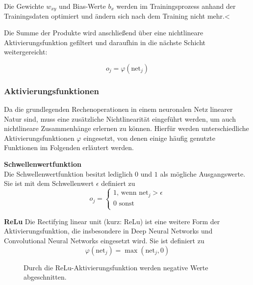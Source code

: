 		Die Gewichte $w_{xy}$ und Bias-Werte $b_x$ werden im Trainingsprozess anhand der Trainingsdaten optimiert und ändern sich nach dem Training nicht mehr.<
		
		
		Die Summe der Produkte wird anschließend über eine nichtlineare Aktivierungsfunktion gefiltert und daraufhin in die nächste Schicht weitergereicht:
		
		\begin{equation}
		\label{eq:perceptron_act}
		o_j = \varphi\left(\text{net}_j\right)
		\end{equation}
		
		
		 
		\subsubsection { Aktivierungsfunktionen }
		Da die grundlegenden Rechenoperationen in einem neuronalen Netz linearer Natur sind, muss eine zusätzliche Nichtlinearität eingeführt werden, um auch nichtlineare Zusammenhänge erlernen zu können. 
		Hierfür werden unterschiedliche Aktivierungsfunktionen $\varphi$ eingesetzt, von denen einige häufig genutzte Funktionen im Folgenden erläutert werden.
		
		
		\textbf{Schwellenwertfunktion}\\
		Die Schwellenwertfunktion besitzt lediglich $0$ und $1$ als mögliche Ausgangswerte. Sie ist mit dem Schwellenwert $\epsilon$ definiert zu 
		\begin{equation}
		\label{eq:acti_sw}
		o_j = \left\{
		\begin{array}{ll}
		1\text{, wenn } \text{net}_j > \epsilon \\
		0 \text{ sonst}\\
		\end{array}
		\right.
		\end{equation}

		\textbf{ReLu}
		Die Rectifying linear unit (kurz: ReLu) ist eine weitere Form der Aktivierungsfunktion, die insbesondere in Deep Neural Networks und Convolutional Neural Networks eingesetzt wird. Sie ist definiert zu
		\begin{equation}
			\label{eq:relu_def}
			\varphi(\text{net}_j) = \max(\text{net}_j, 0)
		\end{equation}
		
		\begin{figure}
			\centering
		\caption{Durch die ReLu-Aktivierungsfunktion werden negative Werte abgeschnitten.}
		\label{fig:relu_plot}
		\end{figure}
	
